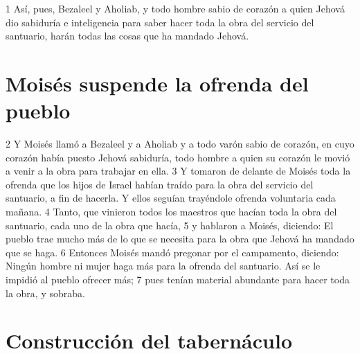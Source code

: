 1 Así, pues, Bezaleel y Aholiab, y todo hombre sabio de corazón a quien Jehová dio sabiduría e inteligencia para saber hacer toda la obra del servicio del santuario, harán todas las cosas que ha mandado Jehová.

\section{Moisés suspende la ofrenda del pueblo}

2 Y Moisés llamó a Bezaleel y a Aholiab y a todo varón sabio de corazón, en cuyo corazón había puesto Jehová sabiduría, todo hombre a quien su corazón le movió a venir a la obra para trabajar en ella.
3 Y tomaron de delante de Moisés toda la ofrenda que los hijos de Israel habían traído para la obra del servicio del santuario, a fin de hacerla. Y ellos seguían trayéndole ofrenda voluntaria cada mañana.
4 Tanto, que vinieron todos los maestros que hacían toda la obra del santuario, cada uno de la obra que hacía,
5 y hablaron a Moisés, diciendo: El pueblo trae mucho más de lo que se necesita para la obra que Jehová ha mandado que se haga.
6 Entonces Moisés mandó pregonar por el campamento, diciendo: Ningún hombre ni mujer haga más para la ofrenda del santuario. Así se le impidió al pueblo ofrecer más;
7 pues tenían material abundante para hacer toda la obra, y sobraba.

\section{Construcción del tabernáculo}

